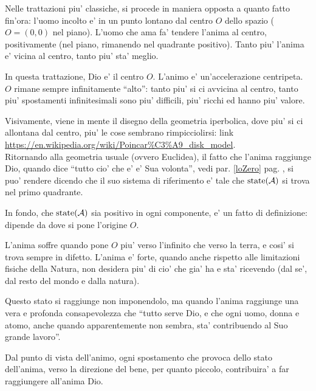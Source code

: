Nelle trattazioni piu' classiche, si procede in maniera opposta a quanto fatto fin'ora: l'uomo incolto e' in un punto lontano dal centro $O$ dello spazio ($O=(0,0)$ nel piano). L'uomo che ama fa' tendere l'anima al centro, positivamente (nel piano, rimanendo nel quadrante positivo). Tanto piu' l'anima e' vicina al centro, tanto piu' sta' meglio.

In questa trattazione, Dio e' il centro $O$. L'animo e' un'accelerazione centripeta. $O$ rimane sempre infinitamente ``alto'': tanto piu' si ci avvicina al centro, tanto piu' spostamenti infinitesimali sono piu' difficili, piu' ricchi ed hanno piu' valore.

Visivamente, viene in mente il disegno della geometria iperbolica, dove piu' si ci allontana dal centro, piu' le cose sembrano rimpicciolirsi: link  \url{https://en.wikipedia.org/wiki/Poincar\%C3\%A9\_disk\_model}.\\



Ritornando alla geometria usuale (ovvero Euclidea), il fatto che l'anima raggiunge Dio, quando dice ``tutto cio' che e' e' Sua volonta'', vedi par. \ref{loZero} pag. \pageref{loZero}, si puo' rendere dicendo che il suo sistema di riferimento e' tale che $\textrm{state}(\mathcal{A})$ si trova nel primo quadrante. 

In fondo, che $\textrm{state}(\mathcal{A})$ sia positivo in ogni componente, e' un fatto di definizione: dipende da dove si pone l'origine $O$.

L'anima soffre quando pone $O$ piu' verso l'infinito che verso la terra, e cosi' si trova sempre in difetto. L'anima e' forte, quando anche rispetto alle limitazioni fisiche della Natura, non desidera piu' di cio' che gia' ha e sta' ricevendo (dal se', dal resto del mondo e dalla natura).

Questo stato si raggiunge non imponendolo, ma quando l'anima raggiunge una vera e profonda consapevolezza che ``tutto serve Dio, e che ogni uomo, donna e atomo, anche quando apparentemente non sembra, sta' contribuendo al Suo grande lavoro''.

Dal punto di vista dell'animo, ogni spostamento che provoca dello stato dell'anima, verso la direzione del bene, per quanto piccolo, contribuira' a far raggiungere all'anima Dio.

